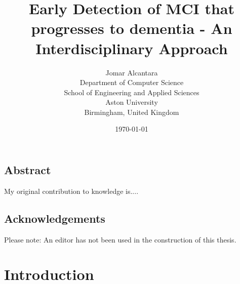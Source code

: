 \documentclass[10pt, letterpaper, twoside, openany]{thesis}
\title{Early Detection of MCI that progresses to dementia - An Interdisciplinary Approach}
\author{
        Jomar Alcantara \\
        Department of Computer Science \\
        School of Engineering and Applied Sciences \\
        Aston University\\
        Birmingham, United Kingdom
}
\date{\today}
\begin{document}
\maketitle
\newpage
\section*{Abstract}
My original contribution to knowledge is....
\newpage
\section*{Acknowledgements}
Please note: An editor has not been used in the construction of this thesis.
\newpage
\tableofcontents
\newpage
\listoffigures
\listoftables

\chapter{Introduction}
\end{document}
